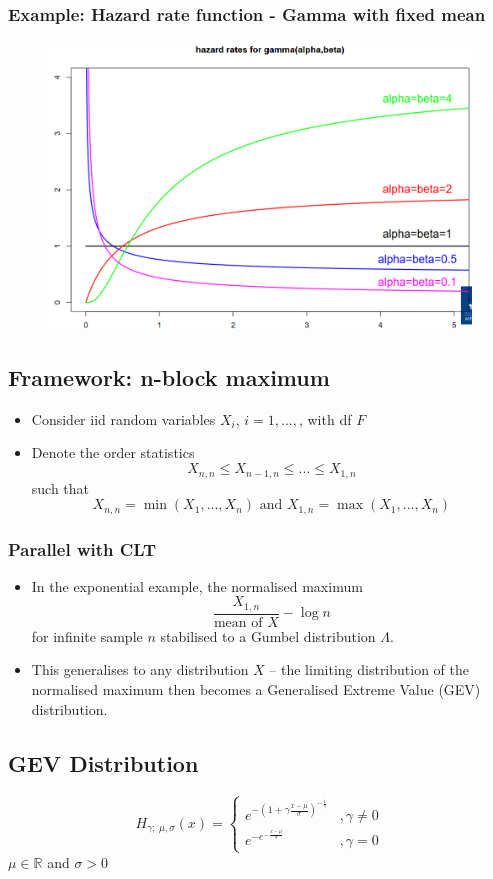 \documentclass[11pt]{article}
\newcommand{\noi}{\noindent}
\begin{document}
\subsubsection*{Example: Hazard rate function - Gamma with fixed mean}
\begin{figure}[H]
    \centering
    \includegraphics[width=0.7\linewidth]{Hazard rate function - gamma example.png}
\end{figure}

\subsection{Framework: n-block maximum}
\begin{itemize}
    \item Consider iid random variables $X_i$, $i=1,...,$, with df $F$
    \item Denote the order statistics
        $$X_{n,n} \leq X_{n-1,n} \leq ... \leq X_{1,n}$$
        such that 
        $$X_{n,n} = \min(X_1,...,X_n) \text{ and } X_{1,n} = \max(X_1,...,X_n)$$
\end{itemize}

\subsubsection{Parallel with CLT}
\begin{itemize}
    \item In the exponential example, the normalised maximum
        $$\frac{X_{1,n}}{\text{mean of } X} - \log n$$
        for infinite sample $n$ stabilised to a Gumbel distribution $\Lambda$.
    \item This generalises to any distribution $X$ -- the limiting distribution of the normalised maximum then becomes a Generalised Extreme Value (GEV) distribution.
\end{itemize}

\subsection{GEV Distribution}
$$H_{\gamma; \ \mu, \sigma}(x) = \begin{cases}
    e^{-(1 + \gamma \frac{x- \mu}{\sigma})^{-\frac{1}{\gamma}}} &, \gamma \neq 0 \\
    e^{-e^{-\frac{x-\mu}{\sigma}}} &, \gamma = 0
\end{cases}$$
\noi $\mu \in \mathbb{R}$ and $\sigma > 0$ \\
\end{document}
